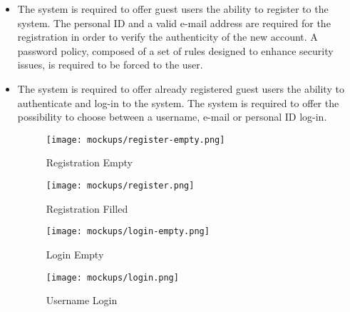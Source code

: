 	\begin{itemize}
		\item The system is required to offer guest users the ability to register to the system. The personal ID and a valid e-mail address are required for the registration in order to verify the authenticity of the new account. A password policy, composed of a set of rules designed to enhance security issues, is required to be forced to the user.
				
		\item The system is required to offer already registered guest users the ability to authenticate and log-in to the system. The system is required to offer the possibility to choose between a username, e-mail or personal ID log-in. \newline\newline
			
			\begin{figure}[h]
  				\centering
  				\begin{minipage}[b]{0.4\textwidth}
    				\texttt{[image: mockups/register-empty.png]}
    					\caption{Registration Empty}
  				\end{minipage}
  				\hfill
  				\begin{minipage}[b]{0.4\textwidth}
    				\texttt{[image: mockups/register.png]}
    				\caption{Registration Filled}
  				\end{minipage}
			\end{figure}
		
			\begin{figure}[h]
  				\centering
  				\begin{minipage}[b]{0.4\textwidth}
    				\texttt{[image: mockups/login-empty.png]}
    					\caption{Login Empty}
  				\end{minipage}
  				\hfill
  				\begin{minipage}[b]{0.4\textwidth}
    				\texttt{[image: mockups/login.png]}
    				\caption{Username Login}
  				\end{minipage}
			\end{figure}
			
	\end{itemize}



